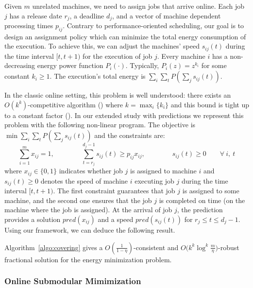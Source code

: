 Given $m$ unrelated machines, we need to assign jobs that arrive online. Each job $j$ has a release date $r_{j}$, a deadline $d_{j}$, and a vector of machine dependent processing times $p_{ij}$. Contrary to performance-oriented scheduling, our goal is to design an assignment policy which can minimize the total energy consumption of the execution. To achieve this, we can adjust the machines' speed $s_{ij}(t)$ during the time interval $[t,t+1)$ for the execution of job $j$. Every machine $i$ has a non-decreasing energy power function $P_{i}(\cdot)$. Typically, $P_{i}(z) = z^{k_{i}}$ for some constant $k_{i} \geq 1$. The execution's total energy is $\sum_{i} \sum_{t} P(\sum_{j} s_{ij}(t))$.

In the classic online setting, this problem is well understood: there exists an $O(k^{k})$-competitive algorithm (\cite{Thang20:Online-Primal-Dual}) where $k = \max_{i} \{k_{i}\}$
and this bound is tight up to a constant factor (\cite{Caragiannis08:Better-bounds}). In our extended study with predictions we represent this problem with the following non-linear program. The objective is $\min \sum_{i} \sum_{t} P(\sum_{j} s_{ij}(t))$ and the constraints are:
$$
\sum_{i=1}^{m} x_{ij} = 1,  \qquad \qquad \sum_{t = r_{j}}^{d_{j}-1} s_{ij}(t) \geq p_{ij} x_{ij}, \qquad  \qquad s_{ij}(t) \geq 0  \qquad \forall\ i,\ t
$$
where $x_{ij} \in \{0,1\}$ indicates whether job $j$ is assigned to machine $i$
and $s_{ij}(t) \geq 0$ denotes the speed of machine $i$ executing job $j$ during the time interval $[t, t+1)$.
The first constraint guarantees that job $j$ is assigned to some machine, and the second one ensures
that the job $j$ is completed on time (on the machine where the job is assigned). At the arrival of
job $j$, the prediction provides a solution $pred(x_{ij})$ and a speed $pred(s_{ij}(t))$ for $r_{j} \leq t \leq d_{j} - 1$.
Using our framework, we can deduce the following result.

\begin{proposition}
Algorithm~\ref{algo:covering} gives a
$O(\frac{1}{1 - \eta})$-consistent and $O\bigl(k^{k} \log^{k} \frac{m}{\eta}\bigr)$-robust fractional solution
for the energy minimization problem.
\end{proposition}

\subsubsection{Online Submodular Mimimization}	\label{sec:sub-min}

